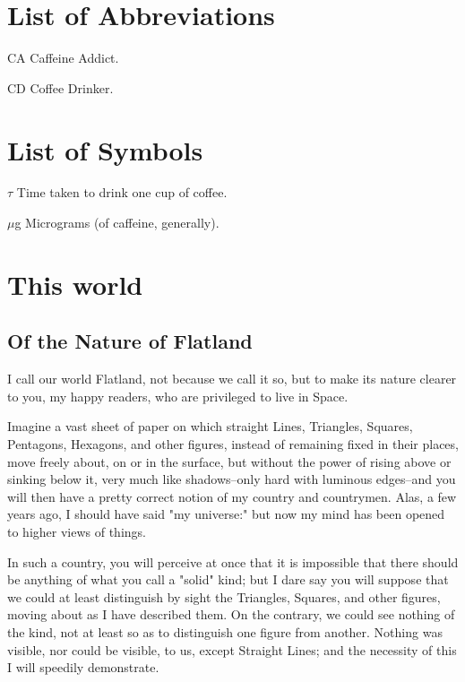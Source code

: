 \documentclass[edeposit,fullpage]{uiucthesis2009}
\begin{document}
\tableofcontents
\listoftables
\listoffigures

\chapter{List of Abbreviations}

\begin{symbollist*}
\item[CA] Caffeine Addict.
\item[CD] Coffee Drinker.
\end{symbollist*}

\chapter{List of Symbols}

\begin{symbollist}[0.7in]
\item[$\tau$] Time taken to drink one cup of coffee.
\item[$\mu$g] Micrograms (of caffeine, generally).
\end{symbollist}

\mainmatter
\chapter{This world}
\section{Of the Nature of Flatland}

I call our world Flatland, not because we call it so, but to make its
nature clearer to you, my happy readers, who are privileged to live in
Space.

Imagine a vast sheet of paper on which straight Lines, Triangles,
Squares, Pentagons, Hexagons, and other figures, instead of remaining
fixed in their places, move freely about, on or in the surface, but
without the power of rising above or sinking below it, very much like
shadows--only hard with luminous edges--and you will then have a pretty
correct notion of my country and countrymen.  Alas, a few years ago, I
should have said "my universe:"  but now my mind has been opened to
higher views of things.

In such a country, you will perceive at once that it is impossible that
there should be anything of what you call a "solid" kind; but I dare
say you will suppose that we could at least distinguish by sight the
Triangles, Squares, and other figures, moving about as I have described
them.  On the contrary, we could see nothing of the kind, not at least
so as to distinguish one figure from another.  Nothing was visible, nor
could be visible, to us, except Straight Lines; and the necessity of
this I will speedily demonstrate.
\end{document}
